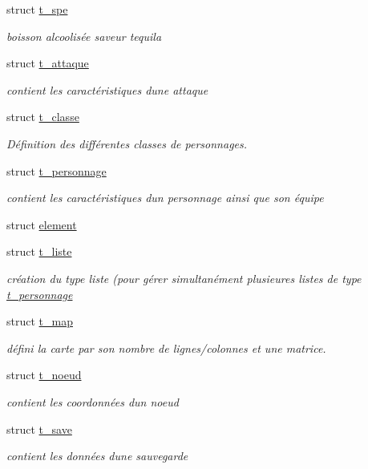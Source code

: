 \begin{DoxyCompactItemize}
\item 
struct \hyperlink{a00010}{t\+\_\+spe}
\begin{DoxyCompactList}\small\item\em boisson alcoolisée saveur tequila \end{DoxyCompactList}\item 
struct \hyperlink{a00002}{t\+\_\+attaque}
\begin{DoxyCompactList}\small\item\em contient les caractéristiques d\textquotesingle{}une attaque \end{DoxyCompactList}\item 
struct \hyperlink{a00003}{t\+\_\+classe}
\begin{DoxyCompactList}\small\item\em Définition des différentes classes de personnages. \end{DoxyCompactList}\item 
struct \hyperlink{a00008}{t\+\_\+personnage}
\begin{DoxyCompactList}\small\item\em contient les caractéristiques d\textquotesingle{}un personnage ainsi que son équipe \end{DoxyCompactList}\item 
struct \hyperlink{a00001}{element}
\item 
struct \hyperlink{a00005}{t\+\_\+liste}
\begin{DoxyCompactList}\small\item\em création du type liste (pour gérer simultanément plusieures listes de type \hyperlink{a00008}{t\+\_\+personnage} \end{DoxyCompactList}\item 
struct \hyperlink{a00006}{t\+\_\+map}
\begin{DoxyCompactList}\small\item\em défini la carte par son nombre de lignes/colonnes et une matrice. \end{DoxyCompactList}\item 
struct \hyperlink{a00007}{t\+\_\+noeud}
\begin{DoxyCompactList}\small\item\em contient les coordonnées d\textquotesingle{}un noeud \end{DoxyCompactList}\item 
struct \hyperlink{a00009}{t\+\_\+save}
\begin{DoxyCompactList}\small\item\em contient les données d\textquotesingle{}une sauvegarde \end{DoxyCompactList}\end{DoxyCompactItemize}
